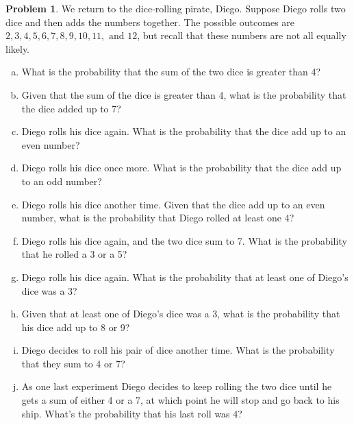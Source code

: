 \documentclass[10pt]{article}
\theoremstyle{definition}
\newtheorem{problem}[theorem]{Problem}
\newcommand{\1}[1]{\textbf{1}_{\left[#1\right]}} %
\begin{document}
\begin{problem}
  We return to the dice-rolling pirate, Diego. Suppose Diego rolls two dice and then adds the numbers
  together. The possible outcomes are $2,3,4,5,6,7,8,9,10,11, \text{ and }12$, but recall that these
  numbers are not all equally likely. 
  \begin{enumerate}[(a),itemsep=0em]
    \item What is the probability that the sum of the two dice is greater than 4? 
    \item Given that the sum of the dice is greater than 4, what is the
    probability that the dice added up to 7?
    \item Diego rolls his dice again. What is the probability that the dice add up to an even number?
    \item Diego rolls his dice once more. What is the probability that the dice add up to an odd
    number?
    \item Diego rolls his dice another time. Given that the dice add up to an even number, what is the
    probability that Diego rolled at least one 4?
    \item Diego rolls his dice again, and the two dice sum to 7. What is the probability that he rolled
    a 3 or a 5?
    \item Diego rolls his dice again. What is the probability that at least one of Diego's dice was a
    3?
    \item Given that at least one of Diego's dice was a 3, what is the probability that his dice add up
    to 8 or 9?
    \item Diego decides to roll his pair of dice another time. What is the
    probability that they sum to 4 or 7?
    \item As one last experiment Diego decides to keep rolling the two dice until he gets a sum of
    either 4 or a 7, at which point he will stop and go back to his ship. What's the probability that
    his last roll was 4?
  \end{enumerate}
\end{problem}
\end{document}
